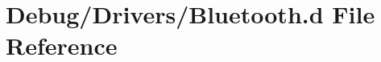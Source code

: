 \hypertarget{Bluetooth_8d}{}\section{Debug/\+Drivers/\+Bluetooth.d File Reference}
\label{Bluetooth_8d}
